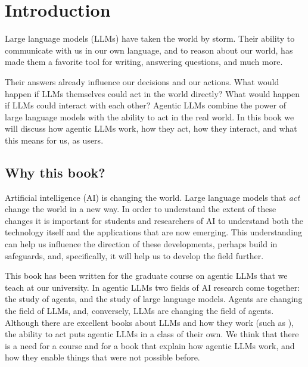 \chapter{Introduction}\label{chap:intro}
Large language models (LLMs) have taken the world by storm. Their ability to communicate with us in our own language, and to reason about our world, has made them a favorite tool for writing, answering questions, and much more. 

Their answers already influence our decisions and our actions. What would happen if LLMs themselves could act in the world directly? What would happen if LLMs could interact with each other? 
Agentic LLMs combine the power of large language models with the ability to act in the real world. In this book we will discuss how agentic LLMs work,  how they act, how they interact, and what this means for us, as users. 

\section{Why this book?}
Artificial intelligence (AI) is changing the world. Large language models that {\em act} change the world in a new way. In order to understand the extent of these changes it is important for  students and researchers of AI to understand both the technology itself %
and the applications that are now emerging. This understanding  can help us influence the direction of these developments,  perhaps build in safeguards, and, specifically, it will help us to develop the field further. 

This book has been written for the graduate course on agentic LLMs that we teach at our university. 
In agentic LLMs two fields of AI research come together: the study of agents, and the study of large language models.
Agents are changing the field of LLMs, and, conversely, LLMs are changing the field of agents. %
%
Although there are excellent books about LLMs and how they work (such as \citet{jm3}), the ability to act puts agentic LLMs in a class of their own. We think that there is a need for a course and for a book that explain how agentic LLMs work, and how they enable things that were  not possible before.

